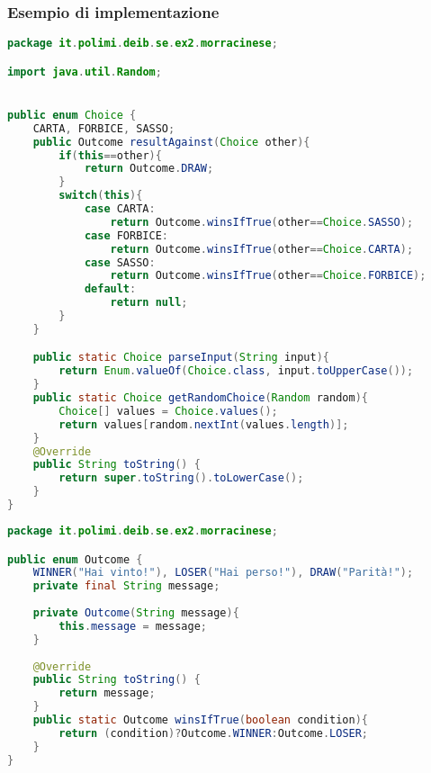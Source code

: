 \documentclass{article}
\begin{document}
\subsubsection{Esempio di implementazione}


\begin{lstlisting}[language=Java,escapechar=|]
package it.polimi.deib.se.ex2.morracinese;

import java.util.Random;


public enum Choice {
    CARTA, FORBICE, SASSO;
    public Outcome resultAgainst(Choice other){
        if(this==other){
            return Outcome.DRAW;
        }
        switch(this){
            case CARTA:
                return Outcome.winsIfTrue(other==Choice.SASSO);		
            case FORBICE:
                return Outcome.winsIfTrue(other==Choice.CARTA);		
            case SASSO:
                return Outcome.winsIfTrue(other==Choice.FORBICE);	
            default:
                return null;
        }		
    }

    public static Choice parseInput(String input){
        return Enum.valueOf(Choice.class, input.toUpperCase());
    }
    public static Choice getRandomChoice(Random random){
        Choice[] values = Choice.values();
        return values[random.nextInt(values.length)];
    }
    @Override
    public String toString() {
        return super.toString().toLowerCase();
    }
}
\end{lstlisting}
\begin{lstlisting}[language=Java,escapechar=|]
package it.polimi.deib.se.ex2.morracinese;

public enum Outcome {
    WINNER("Hai vinto!"), LOSER("Hai perso!"), DRAW("Parità!");
    private final String message;
    
    private Outcome(String message){
        this.message = message;
    }
    
    @Override
    public String toString() {
        return message;
    }
    public static Outcome winsIfTrue(boolean condition){
        return (condition)?Outcome.WINNER:Outcome.LOSER;
    }
}
\end{lstlisting}
\end{document}
